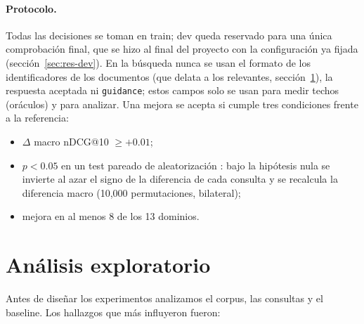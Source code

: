 \documentclass[11pt,a4paper]{article}
\begin{document}
\paragraph{Protocolo.} Todas las decisiones se toman en train; dev queda reservado para una única comprobación final, que se hizo al final del proyecto con la configuración ya fijada (sección~\ref{sec:res-dev}). En la búsqueda nunca se usan el formato de los identificadores de los documentos (que delata a los relevantes, sección~\ref{sec:eda}), la respuesta aceptada ni \texttt{guidance}; estos campos solo se usan para medir techos (oráculos) y para analizar. Una mejora se acepta si cumple tres condiciones frente a la referencia:
\begin{itemize}
  \item $\Delta$ macro nDCG@10 $\geq +0.01$;
  \item $p < 0.05$ en un test pareado de aleatorización \citep{smucker2007comparison}: bajo la hipótesis nula se invierte al azar el signo de la diferencia de cada consulta y se recalcula la diferencia macro (10,000 permutaciones, bilateral);
  \item mejora en al menos 8 de los 13 dominios.
\end{itemize}

\section{Análisis exploratorio}
\label{sec:eda}

Antes de diseñar los experimentos analizamos el corpus, las consultas y el baseline. Los hallazgos que más influyeron fueron:
\end{document}
